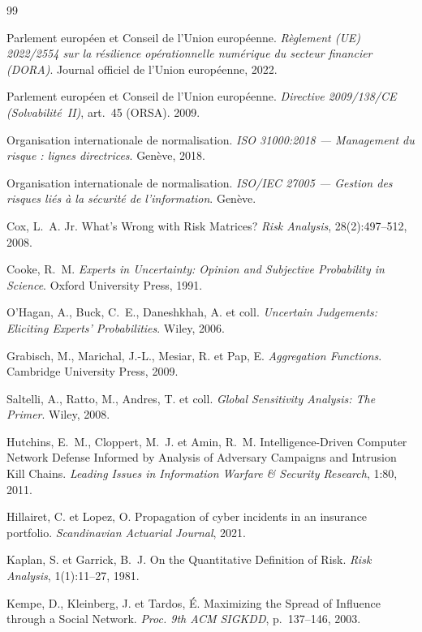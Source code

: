 \documentclass[11pt,a4paper]{article}
\begin{document}
\begin{thebibliography}{99}

Parlement européen et Conseil de l'Union européenne.
\emph{Règlement (UE) 2022/2554 sur la résilience opérationnelle numérique du secteur
financier (DORA)}. Journal officiel de l'Union européenne, 2022.

Parlement européen et Conseil de l'Union européenne.
\emph{Directive 2009/138/CE (Solvabilité~II)}, art.~45 (ORSA). 2009.

Organisation internationale de normalisation.
\emph{ISO 31000:2018 --- Management du risque : lignes directrices}. Genève, 2018.

Organisation internationale de normalisation.
\emph{ISO/IEC 27005 --- Gestion des risques liés à la sécurité de l'information}. Genève.

Cox, L.~A. Jr.
\og What's Wrong with Risk Matrices?\fg{}
\emph{Risk Analysis}, 28(2):497--512, 2008.

Cooke, R.~M.
\emph{Experts in Uncertainty: Opinion and Subjective Probability in Science}.
Oxford University Press, 1991.

O'Hagan, A., Buck, C.~E., Daneshkhah, A. et coll.
\emph{Uncertain Judgements: Eliciting Experts' Probabilities}. Wiley, 2006.

Grabisch, M., Marichal, J.-L., Mesiar, R. et Pap, E.
\emph{Aggregation Functions}. Cambridge University Press, 2009.

Saltelli, A., Ratto, M., Andres, T. et coll.
\emph{Global Sensitivity Analysis: The Primer}. Wiley, 2008.

Hutchins, E.~M., Cloppert, M.~J. et Amin, R.~M.
\og Intelligence-Driven Computer Network Defense Informed by Analysis of Adversary
Campaigns and Intrusion Kill Chains\fg{}.
\emph{Leading Issues in Information Warfare \& Security Research}, 1:80, 2011.

Hillairet, C. et Lopez, O.
\og Propagation of cyber incidents in an insurance portfolio\fg{}.
\emph{Scandinavian Actuarial Journal}, 2021.

Kaplan, S. et Garrick, B.~J.
\og On the Quantitative Definition of Risk\fg{}.
\emph{Risk Analysis}, 1(1):11--27, 1981.

Kempe, D., Kleinberg, J. et Tardos, {\'E}.
\og Maximizing the Spread of Influence through a Social Network\fg{}.
\emph{Proc. 9th ACM SIGKDD}, p.~137--146, 2003.


\end{thebibliography}
\end{document}
